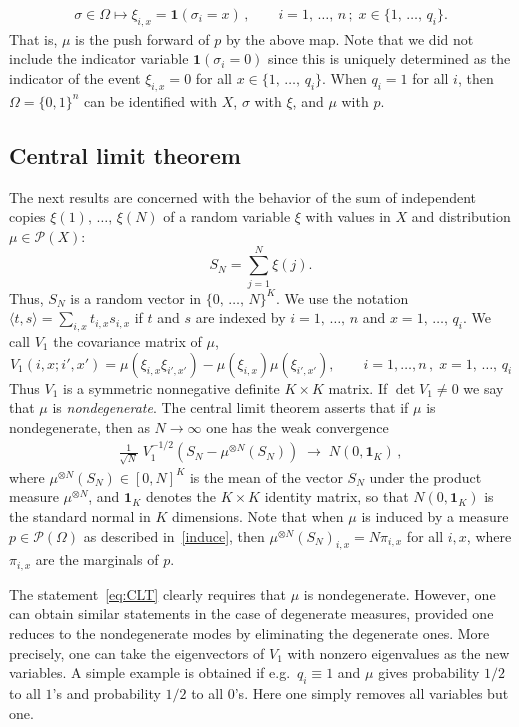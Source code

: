 \documentclass[10pt,a4paper]{article}
\newcommand{\si}{\sigma}
\newcommand{\scalar}[2]{\langle #1, #2\rangle}
\newcommand{\ind}{\mathbf{1}}
\newcommand{\cP}{\mathcal{P}}
\let\O=\Omega
\begin{document}
\begin{align}\label{induce}
\si\in\O \mapsto \xi_{i,x} = \ind(\si_i=x)\,,\qquad i=1,\,\dots,\,n\,;\; x\in \{1,\,\dots,\,q_i\}.
\end{align}
That is, $\mu$ is the push forward of $p$ by the above map. Note that we did not include the indicator variable $ \ind(\si_i=0)$ since this is uniquely determined as the indicator of the event $\xi_{i,x}=0$ for all $x\in \{1,\,\dots,\,q_i\}$. When $q_i=1$ for all $i$, then $\O=\{0,1\}^n$ can be identified with $X$, $\si$ with $\xi$, and $\mu$ with $p$.


\subsection{Central limit theorem}

The next results are concerned with the behavior of the sum of independent copies $\xi(1),\,\dots,\,\xi(N)$ of a random variable $\xi$ with values in $X$ and distribution $\mu\in\cP(X)$:
\[
S_N = \sum_{j=1}^N\xi(j).
\]
Thus, $S_N$ is a random vector in $\{0,\,\dots,\,N\}^K$. We use the notation $\scalar{t}{s}=\sum_{i,x}t_{i,x}s_{i,x}$ if $t$ and $s$ are indexed by $i=1,\,\dots,\,n$ and $x=1,\,\dots,\,q_i$. We call $V_1$ the covariance matrix of $\mu$,
\[
V_1(i,x;i',x')=\mu(\xi_{i,x}\xi_{i',x'})-\mu(\xi_{i,x})\mu(\xi_{i',x'}),\qquad i=1,\dots,n\,,\; x=1,\,\dots,\,q_i
\]
Thus $V_1$ is a symmetric nonnegative definite $K\times K$ matrix. If $\det V_1\neq 0$ we say that $\mu$ is \emph{nondegenerate}. The central limit theorem asserts that if $\mu $ is nondegenerate, then as $N\to\infty$ one has the weak convergence
\begin{align}\label{eq:CLT}
\frac1{\sqrt N} \;V_1^{-1/2}\left(S_N - \mu^{\otimes N}(S_N)\right)\;
\longrightarrow\; N(0,\ind_K)\,,
\end{align}
where $\mu^{\otimes N}(S_N)\in[0,N]^K$ is the mean of the vector $S_N$ under the product measure $\mu^{\otimes N}$, and $\ind_K$ denotes the $K\times K$ identity matrix, so that $N(0,\ind_K)$ is the standard normal in $K$ dimensions. Note that when $\mu$ is induced by a measure $p\in\cP(\O)$ as described in~\eqref{induce}, then $\mu^{\otimes N}(S_N)_{i,x}=N\pi_{i,x}$ for all $i,x$, where $\pi_{i,x}$ are the marginals of $p$.

The statement~\eqref{eq:CLT} clearly requires that $\mu$ is nondegenerate. However, one can obtain similar statements in the case of degenerate measures, provided one reduces to the nondegenerate modes by eliminating the degenerate ones. More precisely, one can take the eigenvectors of $V_1$ with nonzero eigenvalues as the new variables. A simple example is obtained if e.g.\ $q_i\equiv 1$ and $\mu$ gives probability $1/2$ to all $1$'s and probability $1/2$ to all $0$'s. Here one simply removes all variables but one.
\end{document}
